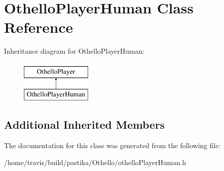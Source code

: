 \hypertarget{classOthelloPlayerHuman}{\section{Othello\-Player\-Human Class Reference}
\label{classOthelloPlayerHuman}
}
Inheritance diagram for Othello\-Player\-Human\-:\begin{figure}[H]
\begin{center}
\leavevmode
\includegraphics[height=2.000000cm]{classOthelloPlayerHuman}
\end{center}
\end{figure}
\subsection*{Additional Inherited Members}


The documentation for this class was generated from the following file\-:\begin{DoxyCompactItemize}
\item 
/home/travis/build/pastika/\-Othello/othello\-Player\-Human.\-h\end{DoxyCompactItemize}
